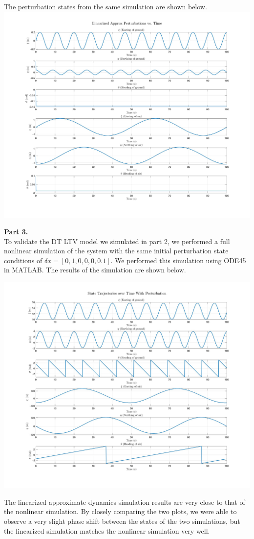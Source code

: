 \documentclass[paper=a4, fontsize=11pt]{scrartcl} %
\numberwithin{equation}{section} %
\numberwithin{figure}{section} %
\numberwithin{table}{section} %
\begin{document}
\begin{framed}
The perturbation states from the same simulation are shown below.
\includegraphics[scale=0.2]{LinearizedPerturbationStateDynamics.png}

\newpage
\textbf{Part 3.} \\
To validate the DT LTV model we simulated in part 2, we performed a full nonlinear simulation of the system with the same initial perturbation state conditions of \(\delta x = [0, 1, 0, 0, 0, 0.1]\). We performed this simulation using ODE45 in MATLAB. The results of the simulation are shown below.

\includegraphics[scale=0.2]{NonlinearSimStateDynamics.png}

The linearized approximate dynamics simulation results are very close to that of the nonlinear simulation. By closely comparing the two plots, we were able to observe a very slight phase shift between the states of the two simulations, but the linearized simulation matches the nonlinear simulation very well.
\end{framed}
\end{document}
